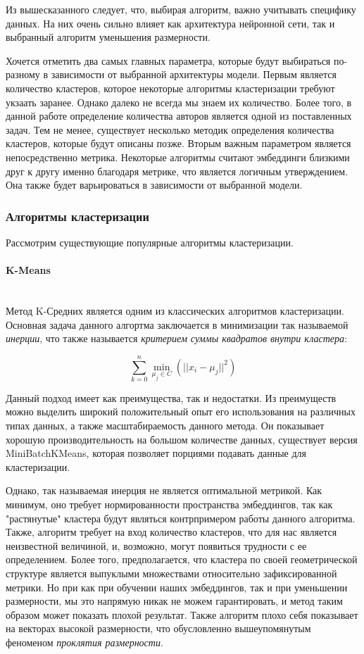 Из вышесказанного следует, что, выбирая алгоритм, важно учитывать специфику данных. На них очень сильно влияет как архитектура нейронной сети, так и выбранный алгоритм уменьшения размерности. 

Хочется отметить два самых главных параметра, которые будут выбираться по-разному в зависимости от выбранной архитектуры модели. Первым является количество кластеров, которое некоторые алгоритмы кластеризации требуют укзаать заранее. Однако далеко не всегда мы знаем их количество. Более того, в данной работе определение количества авторов является одной из поставленных задач. Тем не менее, существует несколько методик определения количества кластеров, которые будут описаны позже. Вторым важным параметром является непосредственно метрика. Некоторые алгоритмы считают эмбеддинги близкими друг к другу именно благодаря метрике, что является логичным утверждением. Она также будет  варьироваться в зависимости от выбранной модели.

\subsubsection{Алгоритмы кластеризации}

Рассмотрим существующие популярные алгоритмы кластеризации.

\paragraph{K-Means}\mbox{} \\

Метод K-Средних является одним из классических алгоритмов кластеризации. Основная задача данного алгортма заключается в минимизации так называемой \textit{инерции}, что также называется \textit{критерием суммы квадратов внутри кластера}:

$$
\sum_{k=0}^{n} \min_{\mu_j \in C}(||x_i - \mu_j||^2)
$$

\bigskip
\noindent
Данный подход имеет как преимущества, так и недостатки. Из преимуществ можно выделить широкий положительный опыт его использования на различных типах данных, а также масштабираемость данного метода. Он показывает хорошую производительность на большом количестве данных, существует версия MiniBatchKMeans, которая позволяет порциями подавать данные для кластеризации.

Однако, так называемая инерция не является оптимальной метрикой. Как минимум, оно требует нормированности пространства эмбеддингов, так как "растянутые" кластера будут являться контрпримером работы данного алгоритма. Также, алгоритм требует на вход количество кластеров, что для нас является неизвестной величиной, и, возможно, могут появиться трудности с ее определением. Более того, предполагается, что кластера по своей геометрической структуре является выпуклыми множествами относительно зафиксированной метрики. Но при как при обучении наших эмбеддингов, так и при уменьшении размерности, мы это напрямую никак не можем гарантировать, и метод таким образом может показать плохой результат. Также алгоритм плохо себя показывает на векторах высокой размерности, что обусловленно вышеупомянутым феноменом \textit{проклятия размерности}.

